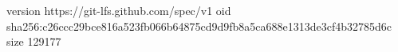version https://git-lfs.github.com/spec/v1
oid sha256:c26ccc29bce816a523fb066b64875cd9d9fb8a5ca688e1313de3cf4b32785d6c
size 129177
